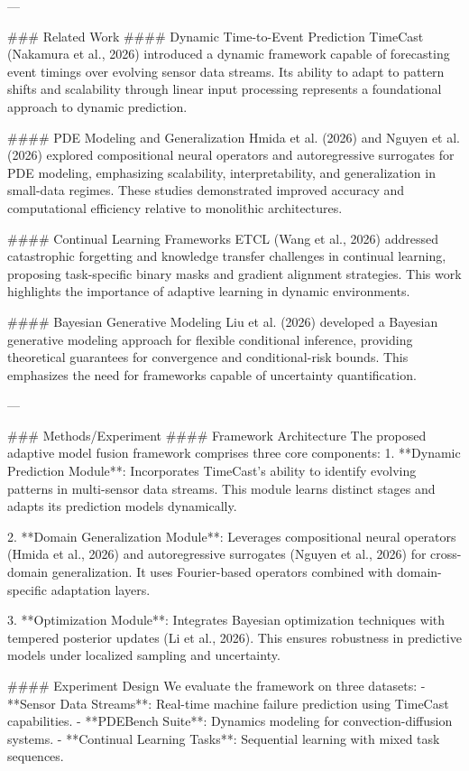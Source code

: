---

### Related Work
#### Dynamic Time-to-Event Prediction
TimeCast (Nakamura et al., 2026) introduced a dynamic framework capable of forecasting event timings over evolving sensor data streams. Its ability to adapt to pattern shifts and scalability through linear input processing represents a foundational approach to dynamic prediction.

#### PDE Modeling and Generalization
Hmida et al. (2026) and Nguyen et al. (2026) explored compositional neural operators and autoregressive surrogates for PDE modeling, emphasizing scalability, interpretability, and generalization in small-data regimes. These studies demonstrated improved accuracy and computational efficiency relative to monolithic architectures.

#### Continual Learning Frameworks
ETCL (Wang et al., 2026) addressed catastrophic forgetting and knowledge transfer challenges in continual learning, proposing task-specific binary masks and gradient alignment strategies. This work highlights the importance of adaptive learning in dynamic environments.

#### Bayesian Generative Modeling
Liu et al. (2026) developed a Bayesian generative modeling approach for flexible conditional inference, providing theoretical guarantees for convergence and conditional-risk bounds. This emphasizes the need for frameworks capable of uncertainty quantification.

---

### Methods/Experiment
#### Framework Architecture
The proposed adaptive model fusion framework comprises three core components:
1. **Dynamic Prediction Module**:
   Incorporates TimeCast's ability to identify evolving patterns in multi-sensor data streams. This module learns distinct stages and adapts its prediction models dynamically.
   
2. **Domain Generalization Module**:
   Leverages compositional neural operators (Hmida et al., 2026) and autoregressive surrogates (Nguyen et al., 2026) for cross-domain generalization. It uses Fourier-based operators combined with domain-specific adaptation layers.

3. **Optimization Module**:
   Integrates Bayesian optimization techniques with tempered posterior updates (Li et al., 2026). This ensures robustness in predictive models under localized sampling and uncertainty.

#### Experiment Design
We evaluate the framework on three datasets:
- **Sensor Data Streams**: Real-time machine failure prediction using TimeCast capabilities.
- **PDEBench Suite**: Dynamics modeling for convection-diffusion systems.
- **Continual Learning Tasks**: Sequential learning with mixed task sequences.

